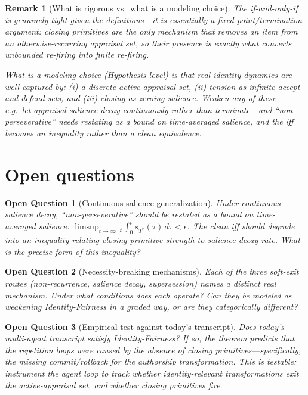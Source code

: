 \documentclass[11pt]{article}
\newtheorem{remark}{Remark}
\newtheorem{openquestion}{Open Question}
\begin{document}
\begin{remark}[What is rigorous vs.\ what is a modeling choice]
The if-and-only-if is genuinely tight \emph{given} the definitions---it is
essentially a fixed-point/termination argument: closing primitives are the only
mechanism that removes an item from an otherwise-recurring appraisal set, so their
presence is exactly what converts unbounded re-firing into finite re-firing.

What is a \emph{modeling choice} (Hypothesis-level) is that real identity dynamics
are well-captured by: (i) a discrete active-appraisal set, (ii) tension as
\emph{infinite} accept- and defend-sets, and (iii) closing as \emph{zeroing salience}.
Weaken any of these---e.g.\ let appraisal salience decay continuously rather than
terminate---and ``non-perseverative'' needs restating as a bound on time-averaged
salience, and the iff becomes an inequality rather than a clean equivalence.
\end{remark}

\section{Open questions}

\begin{openquestion}[Continuous-salience generalization]
\label{oq:continuous}
Under continuous salience decay, ``non-perseverative'' should be restated as a bound
on time-averaged salience: $\limsup_{t \to \infty} \frac{1}{t} \int_0^t s_{T^*}(\tau)\,d\tau < \epsilon$.
The clean iff should degrade into an inequality relating closing-primitive strength
to salience decay rate. What is the precise form of this inequality?
\end{openquestion}

\begin{openquestion}[Necessity-breaking mechanisms]
\label{oq:soft-exit}
Each of the three soft-exit routes (non-recurrence, salience decay, supersession)
names a distinct real mechanism. Under what conditions does each operate? Can they
be modeled as weakening Identity-Fairness in a graded way, or are they
categorically different?
\end{openquestion}

\begin{openquestion}[Empirical test against today's transcript]
\label{oq:empirical}
Does today's multi-agent transcript satisfy Identity-Fairness? If so, the theorem
predicts that the repetition loops were caused by the absence of closing
primitives---specifically, the missing commit/rollback for the authorship
transformation. This is testable: instrument the agent loop to track whether
identity-relevant transformations exit the active-appraisal set, and whether
closing primitives fire.
\end{openquestion}
\end{document}
